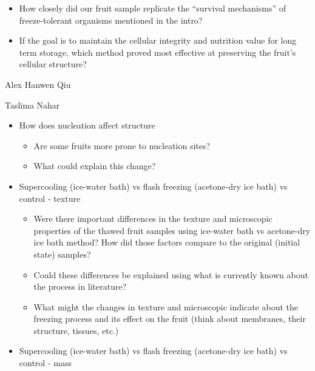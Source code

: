 \begin{itemize}
  \begin{itemize}
  \item
    How closely did our fruit sample replicate the ``survival
    mechanisms'' of freeze-tolerant organisms mentioned in the intro?
  \item
    If the goal is to maintain the cellular integrity and nutrition
    value for long term storage, which method proved most effective at
    preserving the fruit's cellular structure?
  \end{itemize}
\end{itemize}

Alex Hanwen Qiu

Taslima Nahar

\begin{itemize}
\item
  How does nucleation affect structure

  \begin{itemize}
  \item
    Are some fruits more prone to nucleation sites?
  \item
    What could explain this change?
  \end{itemize}
\item
  Supercooling (ice-water bath) vs flash freezing (acetone-dry ice bath)
  vs control - texture

  \begin{itemize}
  \item
    Were there important differences in the texture and microscopic
    properties of the thawed fruit samples using ice-water bath vs
    acetone-dry ice bath method? How did those factors compare to the
    original (initial state) samples?
  \item
    Could these differences be explained using what is currently known
    about the process in literature?
  \item
    What might the changes in texture and microscopic indicate about the
    freezing process and its effect on the fruit (think about membranes,
    their structure, tissues, etc.)
  \end{itemize}
\item
  Supercooling (ice-water bath) vs flash freezing (acetone-dry ice bath)
  vs control - mass


\end{itemize}
